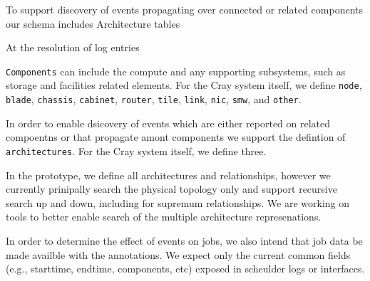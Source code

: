 To support discovery of events propagating over connected or related 
components our schema includes Architecture tables

At the resolution of log entries 

\texttt{Components} can include the compute and any supporting subsystems,
such as storage and facilities related elements. For the Cray system
itself, we define \texttt{node}, \texttt{blade}, \texttt{chassis},
\texttt{cabinet}, \texttt{router}, \texttt{tile}, \texttt{link}, \texttt{nic},
\texttt{smw}, and \texttt{other}.

In order to enable dsicovery of events which are either reported on related
compoentns or that propagate amont components we support the defintion
of \texttt{architectures}. For the Cray system itself, we define three.







In the prototype, we define all architectures and relationships,
however we currently prinipally search the physical topology only
and support recursive search up and down, including for supremum
relationships. We are working on tools to better enable search of
the multiple architecture represenations.

In order to determine the effect of events on jobs, we also
intend that job data be made availble with the annotations.
We expect only the current common fields (e.g., starttime,
endtime, components, etc) exposed in scheulder logs or
interfaces.







